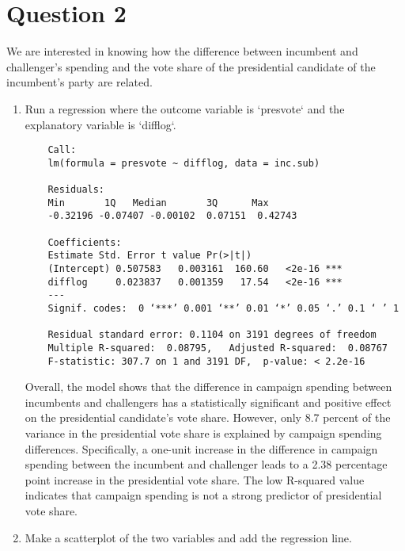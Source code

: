 \documentclass[12pt,letterpaper]{article}
\begin{document}
\section*{Question 2}
\noindent We are interested in knowing how the difference between incumbent and challenger's spending and the vote share of the presidential candidate of the incumbent's party are related.	\vspace{.25cm}
\begin{enumerate}
	\item Run a regression where the outcome variable is `presvote` and the explanatory variable is `difflog`.
	
	\vspace{0.5cm}
	
	
	
	\begin{verbatim}
	Call:
	lm(formula = presvote ~ difflog, data = inc.sub)
	
	Residuals:
	Min       1Q   Median       3Q      Max 
	-0.32196 -0.07407 -0.00102  0.07151  0.42743 
	
	Coefficients:
	Estimate Std. Error t value Pr(>|t|)    
	(Intercept) 0.507583   0.003161  160.60   <2e-16 ***
	difflog     0.023837   0.001359   17.54   <2e-16 ***
	---
	Signif. codes:  0 ‘***’ 0.001 ‘**’ 0.01 ‘*’ 0.05 ‘.’ 0.1 ‘ ’ 1
	
	Residual standard error: 0.1104 on 3191 degrees of freedom
	Multiple R-squared:  0.08795,	Adjusted R-squared:  0.08767 
	F-statistic: 307.7 on 1 and 3191 DF,  p-value: < 2.2e-16
	\end{verbatim}
	Overall, the model shows that the difference in campaign spending between incumbents and challengers has a statistically significant and positive effect on the presidential candidate's vote share. However, only 8.7 percent of the variance in the presidential vote share is explained by campaign spending differences. Specifically, a one-unit increase in the difference in campaign spending between the incumbent and challenger leads to a 2.38 percentage point increase in the presidential vote share. The low R-squared value indicates that campaign spending is not a strong predictor of presidential vote share.
	
	\item Make a scatterplot of the two variables and add the regression line.
	\vspace{0.5cm}
	

\end{enumerate}
\end{document}
